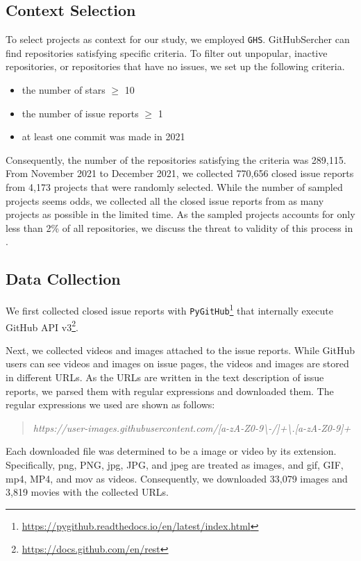\subsection{Context Selection}
To select projects as context for our study, we employed \texttt{GHS}\citep{msr2021data}. GitHubSercher can find repositories satisfying specific criteria. To filter out unpopular, inactive repositories, or repositories that have no issues, we set up the following criteria.
\begin{itemize}
	\item the number of stars $\geq$ 10
	\item the number of issue reports $\geq$ 1
	\item at least one commit was made in 2021
\end{itemize}
Consequently, the number of the repositories satisfying the criteria was 289,115. From November 2021 to December 2021, we collected 770,656 closed issue reports from 4,173 projects that were randomly selected. While the number of sampled projects seems odds, we collected all the closed issue reports from as many projects as possible in the limited time.  
As the sampled projects accounts for only less than 2\% of all repositories, we discuss the threat to validity of this process in . 


% 

\subsection{Data Collection}
We first collected closed issue reports with \texttt{PyGitHub}\footnote{\url{https://pygithub.readthedocs.io/en/latest/index.html}} that internally execute GitHub API v3\footnote{\url{https://docs.github.com/en/rest}}. 

Next, we collected videos and images attached to the issue reports. While GitHub users can see videos and images on issue pages, the videos and images are stored in different URLs. As the URLs are written in the text description of issue reports, we parsed them with regular expressions and downloaded them. The regular expressions we used are shown as follows:
\begin{quote}
\addtolength\leftmargini{0in}
{\it https://user-images.githubusercontent.com/[a-zA-Z0-9\textbackslash-/]+\textbackslash.[a-zA-Z0-9]+}
\end{quote}
Each downloaded file was determined to be a image or video by its extension. Specifically, png, PNG, jpg, JPG, and jpeg are treated as images, and  gif, GIF, mp4, MP4, and mov as videos.
Consequently, we downloaded 33,079 images and 3,819 movies
with the collected URLs. 

